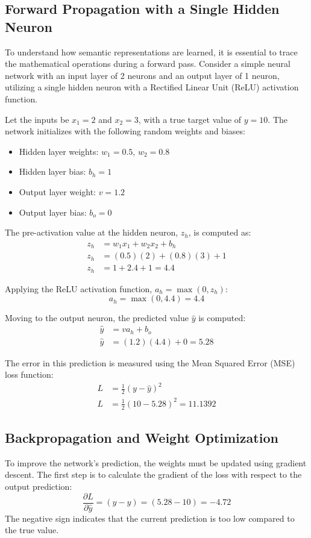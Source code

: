 \documentclass[10pt, conference]{IEEEtran}
\begin{document}
\subsection{\textbf{Forward Propagation with a Single Hidden Neuron}}
To understand how semantic representations are learned, it is essential to trace the mathematical operations during a forward pass. Consider a simple neural network with an input layer of 2 neurons and an output layer of 1 neuron, utilizing a single hidden neuron with a Rectified Linear Unit (ReLU) activation function.

Let the inputs be $x_1 = 2$ and $x_2 = 3$, with a true target value of $y = 10$. The network initializes with the following random weights and biases:
\begin{itemize}
    \item Hidden layer weights: $w_1 = 0.5$, $w_2 = 0.8$
    \item Hidden layer bias: $b_h = 1$
    \item Output layer weight: $v = 1.2$
    \item Output layer bias: $b_o = 0$
\end{itemize}

The pre-activation value at the hidden neuron, $z_h$, is computed as:
\begin{align}
    z_h &= w_1x_1 + w_2x_2 + b_h \\
    z_h &= (0.5)(2) + (0.8)(3) + 1 \\
    z_h &= 1 + 2.4 + 1 = 4.4
\end{align}

Applying the ReLU activation function, $a_h = \max(0, z_h)$:
\begin{equation}
    a_h = \max(0, 4.4) = 4.4
\end{equation}

Moving to the output neuron, the predicted value $\hat{y}$ is computed:
\begin{align}
    \hat{y} &= v a_h + b_o \\
    \hat{y} &= (1.2)(4.4) + 0 = 5.28
\end{align}

The error in this prediction is measured using the Mean Squared Error (MSE) loss function:
\begin{align}
    L &= \frac{1}{2}(y - \hat{y})^2 \\
    L &= \frac{1}{2}(10 - 5.28)^2 = 11.1392
\end{align}

\subsection{\textbf{Backpropagation and Weight Optimization}}
To improve the network's prediction, the weights must be updated using gradient descent. The first step is to calculate the gradient of the loss with respect to the output prediction:
\begin{equation}
    \frac{\partial L}{\partial \hat{y}} = (\hat{y} - y) = (5.28 - 10) = -4.72
\end{equation}
The negative sign indicates that the current prediction is too low compared to the true value.
\end{document}

